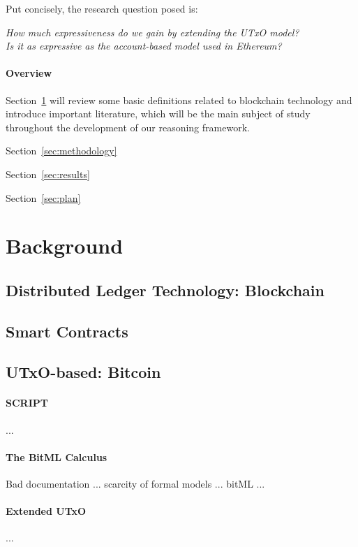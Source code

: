 \documentclass[acmsmall,nonacm=true,screen=true]{acmart}\settopmatter{printfolios=false,printccs=false,printacmref=false}
\begin{document}
Put concisely, the research question posed is:
\begin{displayquote}
	\textit{How much expressiveness do we gain by extending the UTxO model?} \\
	\textit{Is it as expressive as the account-based model used in Ethereum?}
\end{displayquote}

\paragraph{Overview}
Section~\ref{sec:background} will review some basic definitions related to blockchain
technology and introduce important literature, which will be the main subject of study
throughout the development of our reasoning framework.

Section~\ref{sec:methodology} 

Section~\ref{sec:results} 

Section~\ref{sec:plan}

\section{Background}
\label{sec:background}

\subsection{Distributed Ledger Technology: Blockchain}

\subsection{Smart Contracts}

\subsection{UTxO-based: Bitcoin}
\paragraph{\textsc{SCRIPT}}
...

\paragraph{The BitML Calculus}
Bad documentation ... scarcity of formal models ... bitML ...

\paragraph{Extended UTxO}
... 
\end{document}
